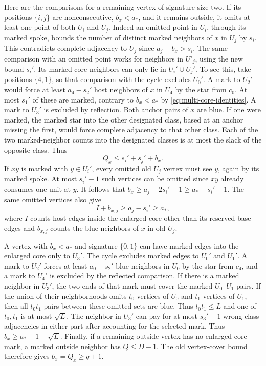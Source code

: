 Here are the comparisons for a remaining vertex of signature size two. If its
positions $\{i,j\}$ are nonconsecutive, $b_x<a_*$, and
it remains outside, it omits at least one point of both $U_i$ and $U_j$.
Indeed an omitted point in $U_i$, through its marked spoke, bounds the
number of distinct marked neighbors of $x$ in $U_j$ by $s_i$. This
contradicts complete adjacency to $U_j$ since $a_j-b_x>s_i$.
The same comparison with an omitted point works for neighbors in
$U'_j$, using the new bound $s_i'$. Its marked core neighbors can only
lie in $U_i'\cup U_j'$. To see this, take positions $\{4,1\}$, so that
comparison with the cycle excludes $U_0'$. A mark to $U_2'$ would force
at least $a_4-s_2'$ host neighbors of $x$ in $U_4$ by the star from
$c_0$. At most $s_1'$ of these are marked, contrary to $b_x<a_*$
by \eqref{eq:multi-core-identities}. A mark to $U_3'$ is excluded by
reflection. Both anchor pairs of $x$ are blue. If one were marked,
the marked star into the other designated class, based at an anchor
missing the first, would force complete adjacency to that other
class. Each of the two marked-neighbor counts into the designated
classes is at most the slack of the opposite class. Thus
\begin{equation}\label{eq:multi-low-blue-outside}
 Q_x\le s_i'+s_j'+b_x.
\end{equation}
If $xy$ is marked with $y\in U_i'$, every omitted old $U_j$ vertex must
see $y$, again by its marked spoke. At most $s_i'-1$ such vertices
can be omitted since $xy$ already consumes one unit at $y$. It follows
that $b_x\ge a_j-2s_i'+1\ge a_*-s_i'+1$. The same omitted vertices
also give
\begin{equation}\label{eq:multi-rectangle}
 I+b_{x,j}\ge a_j-s_i'\ge a_*,
\end{equation}
where $I$ counts host edges inside the enlarged core other than its
reserved base edges and
$b_{x,j}$ counts the blue neighbors of $x$ in old $U_j$.

A vertex with $b_x<a_*$ and signature $\{0,1\}$ can have marked edges
into the enlarged core only to $U_3'$. The cycle excludes marked edges to $U_0'$ and
$U_1'$. A mark to $U_2'$ forces at least $a_0-s_2'$ blue neighbors
in $U_0$ by the star from $c_4$, and a mark to $U_4'$ is excluded
by the reflected comparison. If there is a marked neighbor in $U_3'$,
the two ends of that mark must cover the marked $U_0$--$U_1$ pairs.
If the union of their neighborhoods omits $t_0$ vertices of $U_0$
and $t_1$ vertices of $U_1$, then all $t_0t_1$ pairs between these
omitted sets are blue. Thus $t_0t_1\le L$ and one of $t_0,t_1$ is at
most $\sqrt L$.
The neighbor in $U_3'$ can pay for at most $s_3'-1$ wrong-class
adjacencies in either part after accounting for the selected mark.
Thus $b_x\ge a_*+1-\sqrt L$. Finally, if a remaining outside vertex
has no enlarged core mark, a marked outside neighbor has $Q\le D-1$.
The old vertex-cover bound therefore gives $b_x=Q_x\ge q+1$.

